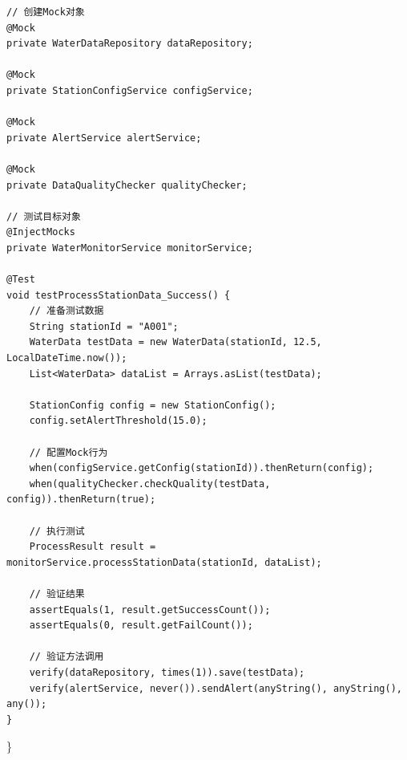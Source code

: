 \begin{verbatim}
// 创建Mock对象
@Mock
private WaterDataRepository dataRepository;

@Mock
private StationConfigService configService;

@Mock
private AlertService alertService;

@Mock
private DataQualityChecker qualityChecker;

// 测试目标对象
@InjectMocks
private WaterMonitorService monitorService;

@Test
void testProcessStationData_Success() {
    // 准备测试数据
    String stationId = "A001";
    WaterData testData = new WaterData(stationId, 12.5, LocalDateTime.now());
    List<WaterData> dataList = Arrays.asList(testData);
    
    StationConfig config = new StationConfig();
    config.setAlertThreshold(15.0);
    
    // 配置Mock行为
    when(configService.getConfig(stationId)).thenReturn(config);
    when(qualityChecker.checkQuality(testData, config)).thenReturn(true);
    
    // 执行测试
    ProcessResult result = monitorService.processStationData(stationId, dataList);
    
    // 验证结果
    assertEquals(1, result.getSuccessCount());
    assertEquals(0, result.getFailCount());
    
    // 验证方法调用
    verify(dataRepository, times(1)).save(testData);
    verify(alertService, never()).sendAlert(anyString(), anyString(), any());
}
\end{verbatim}

\}

